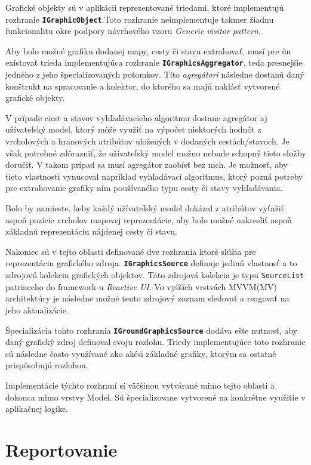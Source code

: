 \bigskip

Grafické objekty sú v aplikácii reprezentované triedami, ktoré implementujú rozhranie \textbf{\texttt{IGraphicObject}}.Toto rozhranie neimplementuje takmer žiadnu funkcionalitu okre podpory návrhového vzoru \textit{Generic visitor pattern}.

Aby bolo možné grafiku dodanej mapy, cesty či stavu extrahovať, musí pre ňu existovať trieda implementujúca rozhranie \textbf{\texttt{IGraphicsAggregator}}, teda presnejšie jedného z jeho špecializovaných potomkov. Títo \textit{agregátori} následne dostanú daný konštrukt na spracovanie a kolektor, do ktorého sa majú naklásť vytvorené grafické objekty.

V prípade ciest a stavov vyhľadávacieho algoritmu dostane agregátor aj užívateľský model, ktorý môže využiť na výpočet niektorých hodnôt z vrcholových a hranových atribútov uložených v dodaných cestách/stavoch. Je však potrebné zdôrazniť, že užívateľský model možno nebude schopný tieto služby doručiť. V takom prípad sa musí agregátor zaobísť bez nich. Je možnosť, aby tieto vlastnosti vynucoval napríklad vyhľadávací algoritmus, ktorý pozná potreby pre extrahovanie grafiky ním používaného typu cesty či stavy vyhľadávania.

Bolo by namieste, keby každý užívateľský model dokázal z atribútov vyťažiť aspoň pozície vrcholov mapovej reprezentácie, aby bolo možné nakresliť aspoň základnú reprezentáciu nájdenej cesty či stavu. 

\bigskip

Nakoniec sú v tejto oblasti definované dve rozhrania ktoré slúžia pre reprezentáciu grafického zdroja. \textbf{\texttt{IGraphicsSource}} definuje jedinú vlastnosť a to zdrojovú kolekciu grafických objektov. Táto zdrojová kolekcia je typu \texttt{SourceList} patriaceho do framework-u \textit{Reactive UI}. Vo vyšších vrstvách MVVM(MV) architektúry je následne možné tento zdrojový zoznam sledovať a reagovať na jeho aktualizácie. 

Špecializácia tohto rozhrania \textbf{\texttt{IGroundGraphicsSource}} dodáva ešte nutnosť, aby daný grafický zdroj definoval svoju rozlohu. Triedy implementujúce toto rozhranie sú následne často využívané ako akési základné grafiky, ktorým sa ostatné prispôsobujú rozlohou.

Implementácie týchto rozhraní sí väčšinou vytvárané mimo tejto oblasti a dokonca mimo vrstvy Model. Sú špecializovane vytvorené na konkrétne využitie v aplikačnej logike. 

\section{Reportovanie}

